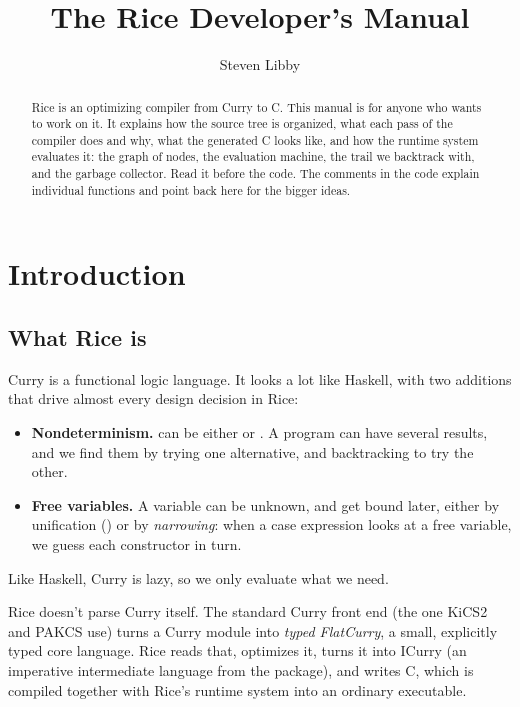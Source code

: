 \documentclass[11pt]{article}
\title{The Rice Developer's Manual}
\author{Steven Libby}
\date{}
\newcommand{\code}[1]{\texttt{\detokenize{#1}}}
\begin{document}
\maketitle

\begin{abstract}
Rice is an optimizing compiler from Curry to C.  This manual is for anyone who
wants to work on it.  It explains how the source tree is organized, what each
pass of the compiler does and why, what the generated C looks like, and how the
runtime system evaluates it: the graph of nodes, the evaluation machine, the
trail we backtrack with, and the garbage collector.  Read it before the code.
The comments in the code explain individual functions and point back here for
the bigger ideas.
\end{abstract}

\tableofcontents

\section{Introduction}

\subsection{What Rice is}

Curry is a functional logic language.  It looks a lot like Haskell, with two
additions that drive almost every design decision in Rice:
\begin{itemize}
  \item \textbf{Nondeterminism.}  \code{x ? y} can be either \code{x} or
    \code{y}.  A program can have several results, and we find them by trying
    one alternative, and backtracking to try the other.
  \item \textbf{Free variables.}  A variable can be unknown, and get bound
    later, either by unification (\code{x =:= Just 3}) or by
    \emph{narrowing}: when a case expression looks at a free variable, we guess
    each constructor in turn.
\end{itemize}
Like Haskell, Curry is lazy, so we only evaluate what we need.

Rice doesn't parse Curry itself.  The standard Curry front end (the one KiCS2 and
PAKCS use) turns a Curry module into \emph{typed FlatCurry}, a small, explicitly
typed core language.  Rice reads that, optimizes it, turns it into ICurry (an
imperative intermediate language from the \code{icurry} package), and writes C,
which is compiled together with Rice's runtime system into an ordinary
executable.
\end{document}
